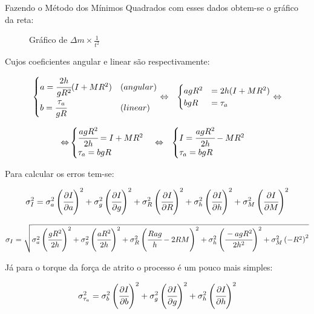 \documentclass{article}
\begin{document}
Fazendo o Método dos Mínimos Quadrados com esses dados obtem-se o
gráfico da reta:\begin{wrapfigure}{o}{0.5\columnwidth}%


\caption{Gráfico de $\Delta m\times\frac{1}{t^{2}}$}


\end{wrapfigure}%


Cujos coeficientes angular e linear são respectivamente:

\begin{eqnarray*}
\begin{cases}
a=\cfrac{2h}{gR^{2}}(I+MR^{2}) & (angular)\\
b=\cfrac{\tau_{a}}{gR} & (linear)
\end{cases} & \Leftrightarrow & \begin{cases}
agR^{2} & =2h(I+MR^{2})\\
bgR & =\tau_{a}
\end{cases}\Leftrightarrow
\end{eqnarray*}


\begin{eqnarray*}
\Leftrightarrow & \begin{cases}
\cfrac[r]{agR^{2}}{2h}=I+MR^{2}\\
\tau_{a}=bgR
\end{cases}\Leftrightarrow & \begin{cases}
I=\cfrac[r]{agR^{2}}{2h}-MR^{2}\\
\tau_{a}=bgR
\end{cases}
\end{eqnarray*}


Para calcular os erros tem-se:

\[
\sigma_{I}^{2}=\sigma_{a}^{2}\left(\cfrac[r]{\partial I}{\partial a}\right)^{2}+\sigma_{g}^{2}\left(\cfrac[r]{\partial I}{\partial g}\right)^{2}+\sigma_{R}^{2}\left(\cfrac{\partial I}{\partial R}\right)^{2}+\sigma_{h}^{2}\left(\cfrac[r]{\partial I}{\partial h}\right)^{2}+\sigma_{M}^{2}\left(\cfrac{\partial I}{\partial M}\right)^{2}
\]


\[
\sigma_{I}=\sqrt{\sigma_{a}^{2}\left(\cfrac[r]{gR^{2}}{2h}\right)^{2}+\sigma_{g}^{2}\left(\cfrac[r]{aR^{2}}{2h}\right)^{2}+\sigma_{R}^{2}\left(\cfrac{Rag}{h}-2RM\right)^{2}+\sigma_{h}^{2}\left(\cfrac[r]{-agR^{2}}{2h^{2}}\right)^{2}+\sigma_{M}^{2}\left(-R^{2}\right)^{2}}
\]


Já para o torque da força de atrito o processo é um pouco mais simples:

\[
\sigma_{\tau_{a}}^{2}=\sigma_{b}^{2}\left(\cfrac[r]{\partial I}{\partial b}\right)^{2}+\sigma_{g}^{2}\left(\cfrac[r]{\partial I}{\partial g}\right)^{2}+\sigma_{h}^{2}\left(\cfrac[r]{\partial I}{\partial h}\right)^{2}
\]
\end{document}
